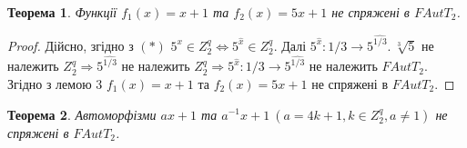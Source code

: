 \documentclass[a4paper,12pt]{article} \usepackage{a4wide}
\numberwithin{equation}{subsection}
\newtheorem{theorem}{Теорема}[subsection]
\begin{document}
\begin{theorem}
Функції $f_1(x)=x+1$ та $f_2(x)=5x+1$ не спряжені в $FAutT_2$.
\end{theorem}

\begin{proof}
Дійсно, згідно з $(* )$ $5^x\in Z^q_2 \Leftrightarrow
5^{\widehat{x}}\in Z^q_2 $. Далі $5^{\widehat{x}}:1/3 \rightarrow
5^{\widehat{1/3}}.\  \sqrt[3]{5}$ не належить $Z^q_2 \Rightarrow
5^{\widehat{1/3}} $ не належить $Z^q_2 \Rightarrow
5^{\widehat{x}}:1/3\rightarrow 5^{\widehat{1/3}} $ не належить
$FAutT_2$. Згідно з лемою 3 $f_1(x)=x+1$ та $f_2(x)=5x+1$ не
спряжені в $FAutT_2$.
\end{proof}

\begin{theorem} Автоморфізми ${ax+1}$ та ${a^{-1}x+1}\ (a=4k+1, k\in Z^q_2,a\neq 1)$ не спряжені в
$FAutT_2$.
\end{theorem}
\end{document}
